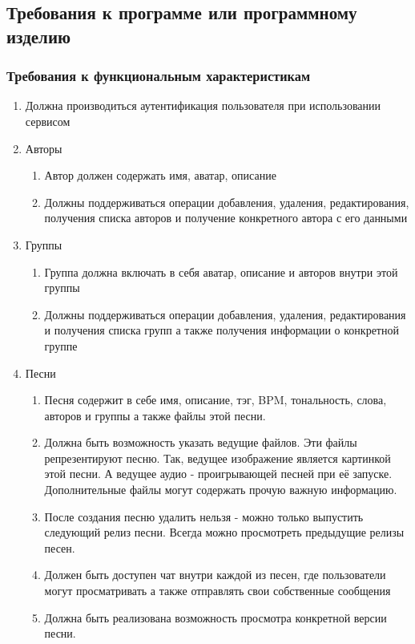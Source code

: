\documentclass[14pt]{extarticle}
\begin{document}
\subsection{Требования к программе или программному изделию}
\subsubsection{Требования к функциональным характеристикам}
\begin{enumerate}
	\item Должна производиться аутентификация пользователя при использовании сервисом
	\item Авторы
	\begin{enumerate}
		\item Автор должен содержать имя, аватар, описание
		\item Должны поддерживаться операции добавления, удаления, редактирования, получения списка авторов и получение конкретного автора с его данными 
	\end{enumerate}
	\item Группы
	\begin{enumerate}
		\item Группа должна включать в себя аватар, описание и авторов внутри этой группы
		\item Должны поддерживаться операции добавления, удаления, редактирования и получения списка групп а также получения информации о конкретной группе 
	\end{enumerate}
	\item Песни
	\begin{enumerate}
		\item Песня содержит в себе имя, описание, тэг, BPM, тональность, слова, авторов и группы а также файлы этой песни.
		\item Должна быть возможность указать ведущие файлов. Эти файлы репрезентируют песню. Так, ведущее изображение является картинкой этой песни. А ведущее аудио - проигрывающей песней при её запуске. Дополнительные файлы могут содержать прочую важную информацию.
		\item После создания песню удалить нельзя - можно только выпустить следующий релиз песни. Всегда можно просмотреть предыдущие релизы песен.
		\item Должен быть доступен чат внутри каждой из песен, где пользователи могут просматривать а также отправлять свои собственные сообщения
		\item Должна быть реализована возможность просмотра конкретной версии песни.

\end{enumerate}
\end{enumerate}
\end{document}
